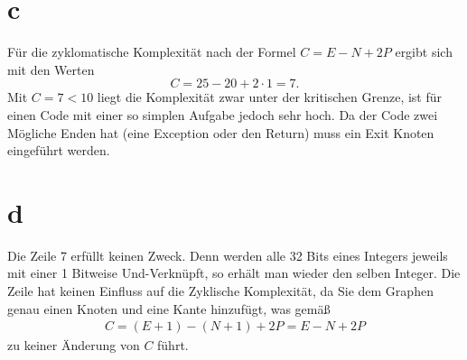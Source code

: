 \section*{c}
Für die zyklomatische Komplexität nach der Formel $ C=E-N+2P$ ergibt sich mit den Werten
\begin{equation}
	C= 25-20+2 \cdot 1 = 7.
\end{equation}
Mit $C=7<10$ liegt die Komplexität zwar unter der kritischen Grenze, ist für einen Code mit einer so simplen Aufgabe jedoch sehr hoch. 
Da der Code zwei Mögliche Enden hat (eine Exception oder den Return) muss ein Exit Knoten eingeführt werden.



%

\section*{d}
Die Zeile 7 erfüllt keinen Zweck. Denn werden alle 32 Bits eines Integers jeweils mit einer 1 Bitweise Und-Verknüpft, so erhält man wieder den selben Integer.
Die Zeile hat keinen Einfluss auf die Zyklische Komplexität, da Sie dem Graphen genau einen Knoten und eine Kante hinzufügt, was gemäß
\begin{align}
	C = (E + 1) - (N + 1) + 2P = E - N + 2P
\end{align}
zu keiner Änderung von $C$ führt.